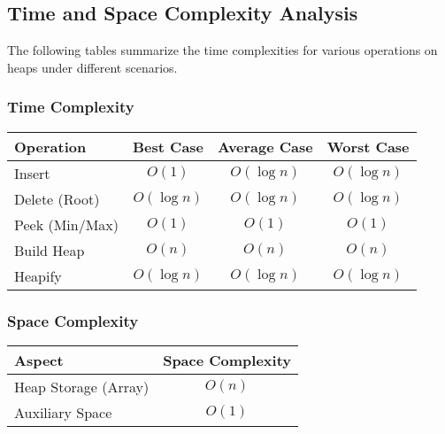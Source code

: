 \documentclass[a4paper,10pt]{article}
\begin{document}
\subsection{Time and Space Complexity Analysis}
The following tables summarize the time complexities for various operations on heaps under different scenarios.

\subsubsection*{Time Complexity}
\begin{table}[H]
    \raggedright
    \begin{tabular}{|l|c|c|c|}
    \hline
    \textbf{Operation} & \textbf{Best Case} & \textbf{Average Case} & \textbf{Worst Case} \\ \hline
    Insert             & $O(1)$             & $O(\log n)$           & $O(\log n)$         \\ \hline
    Delete (Root)      & $O(\log n)$        & $O(\log n)$           & $O(\log n)$         \\ \hline
    Peek (Min/Max)     & $O(1)$             & $O(1)$                & $O(1)$              \\ \hline
    Build Heap         & $O(n)$             & $O(n)$                & $O(n)$              \\ \hline
    Heapify            & $O(\log n)$        & $O(\log n)$           & $O(\log n)$         \\ \hline
    \end{tabular}
\end{table}
    

\subsubsection*{Space Complexity}
\begin{table}[H]
    \raggedright
    \begin{tabular}{|l|c|}
    \hline
    \textbf{Aspect}         & \textbf{Space Complexity} \\ \hline
    Heap Storage (Array)    & $O(n)$                    \\ \hline
    Auxiliary Space         & $O(1)$                    \\ \hline
    \end{tabular}
\end{table}
\end{document}
